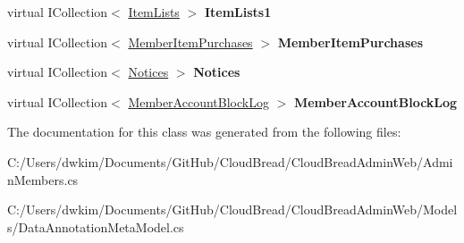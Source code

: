 \begin{DoxyCompactItemize}
\item 
virtual I\+Collection$<$ \hyperlink{a00127}{Item\+Lists} $>$ {\bfseries Item\+Lists1}\hypertarget{a00012_ab9966913bf9066af36854b89bb31559f}{}\label{a00012_ab9966913bf9066af36854b89bb31559f}

\item 
virtual I\+Collection$<$ \hyperlink{a00141}{Member\+Item\+Purchases} $>$ {\bfseries Member\+Item\+Purchases}\hypertarget{a00012_a20dd33b5b3af8ddb5ace97df907e731d}{}\label{a00012_a20dd33b5b3af8ddb5ace97df907e731d}

\item 
virtual I\+Collection$<$ \hyperlink{a00168}{Notices} $>$ {\bfseries Notices}\hypertarget{a00012_a8dee785902766e4727902f0fb2fb3729}{}\label{a00012_a8dee785902766e4727902f0fb2fb3729}

\item 
virtual I\+Collection$<$ \hyperlink{a00135}{Member\+Account\+Block\+Log} $>$ {\bfseries Member\+Account\+Block\+Log}\hypertarget{a00012_affafc7960d9c84199034ce1518ea3a76}{}\label{a00012_affafc7960d9c84199034ce1518ea3a76}

\end{DoxyCompactItemize}


The documentation for this class was generated from the following files\+:\begin{DoxyCompactItemize}
\item 
C\+:/\+Users/dwkim/\+Documents/\+Git\+Hub/\+Cloud\+Bread/\+Cloud\+Bread\+Admin\+Web/Admin\+Members.\+cs\item 
C\+:/\+Users/dwkim/\+Documents/\+Git\+Hub/\+Cloud\+Bread/\+Cloud\+Bread\+Admin\+Web/\+Models/Data\+Annotation\+Meta\+Model.\+cs\end{DoxyCompactItemize}
